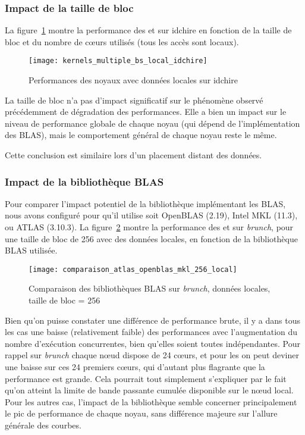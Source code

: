 


\subsubsection{Impact de la taille de bloc}

La figure~\ref{fig:contribs:apps:cholesky:perf-multiple-bs-idchire} montre la performance des \gemm et \potrf sur idchire en fonction de la taille de bloc et du nombre de cœurs utilisés (tous les accès sont locaux).

\begin{figure}[ht]
  \centering
  \texttt{[image: kernels\_multiple\_bs\_local\_idchire]}
  \caption{Performances des noyaux avec données locales sur idchire}\label{fig:contribs:apps:cholesky:perf-multiple-bs-idchire}
\end{figure}

La taille de bloc n'a pas d'impact significatif sur le phénomène observé précédemment de dégradation des performances.
Elle a bien un impact sur le niveau de performance globale de chaque noyau (qui dépend de l'implémentation des BLAS), mais le comportement général de chaque noyau reste le même.

Cette conclusion est similaire lors d'un placement distant des données.


\subsubsection{Impact de la bibliothèque BLAS}

Pour comparer l'impact potentiel de la bibliothèque implémentant les BLAS, nous avons configuré \outil pour qu'il utilise soit OpenBLAS (2.19), Intel MKL (11.3), ou ATLAS (3.10.3).
La figure~\ref{fig:contribs:apps:cholesky:perf-blas} montre la performance des \gemm et \potrf sur \emph{brunch}, pour une taille de bloc de 256 avec des données locales, en fonction de la bibliothèque BLAS utilisée.

\begin{figure}[ht]
  \centering
  \texttt{[image: comparaison\_atlas\_openblas\_mkl\_256\_local]}
  \caption{Comparaison des bibliothèques BLAS sur \emph{brunch}, données locales, taille de bloc = 256}\label{fig:contribs:apps:cholesky:perf-blas}
\end{figure}

Bien qu'on puisse constater une différence de performance brute, il y a dans tous les cas une baisse (relativement faible) des performances avec l'augmentation du nombre d'exécution concurrentes, bien qu'elles soient toutes indépendantes.
Pour rappel sur \emph{brunch} chaque nœud dispose de 24 cœurs, et pour les \gemm on peut deviner une baisse sur ces 24 premiers cœurs, qui d'autant plus flagrante que la performance est grande.
Cela pourrait tout simplement s'expliquer par le fait qu'on atteint la limite de bande passante cumulée disponible sur le nœud local.
Pour les autres cas, l'impact de la bibliothèque semble concerner principalement le pic de performance de chaque noyau, sans différence majeure sur l'allure générale des courbes.

